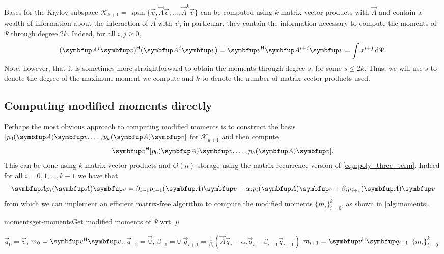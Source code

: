     Bases for the Krylov subspace \( \mathcal{K}_{k+1} = \operatorname{span}\{ \vec{v}, \vec{A}\vec{v}, \ldots, \vec{A}^k \vec{v} \} \) can be computed using \( k \) matrix-vector products with \( \vec{A} \) and contain a wealth of information about the interaction of \( \vec{A} \) with \( \vec{v} \); in particular, they contain the information necessary to compute the moments of \( \Psi \) through degree \( 2k \).
    Indeed, for all \( i,j \geq 0 \),
    \begin{equation*}
        (\vec{A}^j\vec{v})^\cT (\vec{A}^j\vec{v}) = \vec{v}^\cT \vec{A}^{i+j} \vec{v} = \int x^{i+j} \,\d\Psi.
    \end{equation*}
    Note, however, that it is sometimes more straightforward to obtain the moments through degree \( s \), for some \( s\leq 2k \).
    Thus, we will use \( s \) to denote the degree of the maximum moment we compute and \( k \) to denote the number of matrix-vector products used.



    \subsection{Computing modified moments directly}
    \label{sec:moments_direct}
   
    Perhaps the most obvious approach to computing modified moments is to construct the basis \( [ p_0\A\vec{v}, \ldots, p_{k}\A\vec{v}] \) for \( \mathcal{K}_{k+1} \) and then compute 
    \begin{equation*}
        \vec{v}^\cT [ p_0\A\vec{v}, \ldots, p_{k}\A\vec{v}].
    \end{equation*}
    This can be done using \( k \) matrix-vector products and \( O(n) \) storage using the matrix recurrence version of \cref{eqn:poly_three_term}.
    Indeed for all \( i=0,1,\ldots, k-1 \) we have that
    \begin{equation*}
        \vec{A} p_i\A \vec{v} =  \beta_{i-1} p_{i-1}\A\vec{v} + \alpha_i p_i\A\vec{v} + \beta_{i} p_{i+1}\A\vec{v}
    \end{equation*}
    from which we can implement an efficient matrix-free algorithm to compute the modified moments \( \{ m_i \}_{i=0}^{k} \), as shown in \cref{alg:moments}.

    \begin{labelalgorithm}[H]{moments}{get-moments}{Get modified moments of \( \Psi \) wrt. \( \mu \)}
    \begin{algorithmic}[1]
        \State \( \vec{q}_0 = \vec{v} \), \( m_0 = \vec{v}^\cT\vec{v} \), \( \vec{q}_{-1} = \vec{0} \), \( \beta_{-1} = 0 \)
            \State \( \vec{q}_{i+1} = \frac{1}{\beta_{i}} \left( \vec{A} \vec{q}_i - \alpha_i \vec{q}_i - \beta_{i-1} \vec{q}_{i-1} \right) \)
            \State \( m_{i+1}  = \vec{v}^\cT \vec{q}_{i+1} \)
        \EndFor
        \State \Return \( \{ m_i \}_{i=0}^{k} \)
    \EndProcedure
    \end{algorithmic}
    \end{labelalgorithm}

